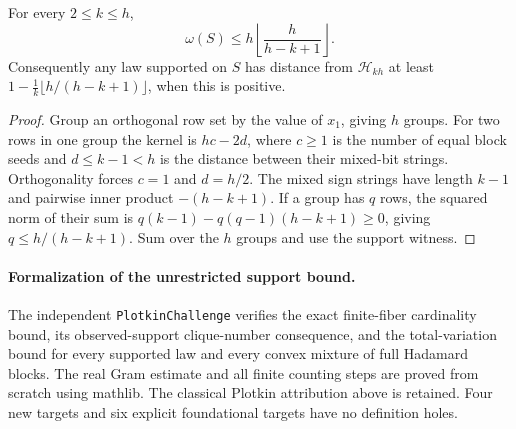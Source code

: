 \begin{proposition}
\label{s25:prop:design-plotkin-support}
For every $2\le k\le h$,
\[
 \omega(S)\le h\left\lfloor\frac{h}{h-k+1}\right\rfloor.
\]
Consequently any law supported on $S$ has distance from $\mathcal H_{kh}$
at least
$1-\frac1k\lfloor h/(h-k+1)\rfloor$, when this is positive.
\end{proposition}
\begin{proof}
Group an orthogonal row set by the value of $x_1$, giving $h$ groups.
For two rows in one group the kernel is $h c-2d$, where $c\ge1$ is
the number of equal block seeds and $d\le k-1<h$ is the distance
between their mixed-bit strings. Orthogonality forces $c=1$ and
$d=h/2$. The mixed sign strings have length $k-1$ and pairwise inner
product $-(h-k+1)$. If a group has $q$ rows, the squared norm of their
sum is $q(k-1)-q(q-1)(h-k+1)\ge0$, giving
$q\le h/(h-k+1)$. Sum over the $h$ groups and use the support witness.
\end{proof}

\paragraph{Formalization of the unrestricted support bound.}
The independent \texttt{PlotkinChallenge} verifies the exact finite-fiber
cardinality bound, its observed-support clique-number consequence, and the
total-variation bound for every supported law and every convex mixture of
full Hadamard blocks. The real Gram estimate and all finite counting steps
are proved from scratch using mathlib. The classical Plotkin attribution
above is retained. Four new targets and six explicit foundational targets
have no definition holes.

